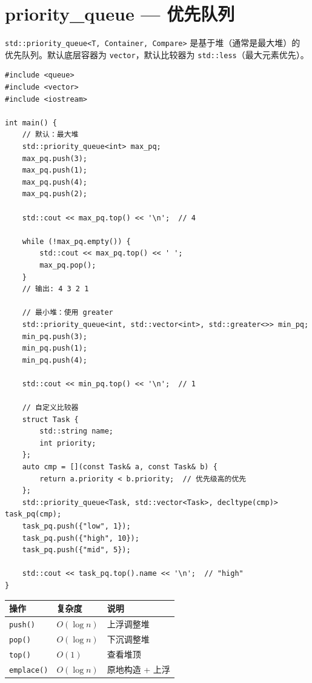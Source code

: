 \documentclass[12pt,a4paper,fontset=fandol]{ctexbook}
\newcommand{\Fn}[1]{\texttt{#1()}}
\newcommand{\Tp}[1]{\texttt{#1}}
\begin{document}
\chapter{priority\_queue --- 优先队列}

\Tp{std::priority\_queue<T, Container, Compare>} 是基于堆（通常是最大堆）的
优先队列。默认底层容器为 \Tp{vector}，默认比较器为 \Tp{std::less}（最大元素优先）。

\begin{lstlisting}
#include <queue>
#include <vector>
#include <iostream>

int main() {
    // 默认：最大堆
    std::priority_queue<int> max_pq;
    max_pq.push(3);
    max_pq.push(1);
    max_pq.push(4);
    max_pq.push(2);

    std::cout << max_pq.top() << '\n';  // 4

    while (!max_pq.empty()) {
        std::cout << max_pq.top() << ' ';
        max_pq.pop();
    }
    // 输出: 4 3 2 1

    // 最小堆：使用 greater
    std::priority_queue<int, std::vector<int>, std::greater<>> min_pq;
    min_pq.push(3);
    min_pq.push(1);
    min_pq.push(4);

    std::cout << min_pq.top() << '\n';  // 1

    // 自定义比较器
    struct Task {
        std::string name;
        int priority;
    };
    auto cmp = [](const Task& a, const Task& b) {
        return a.priority < b.priority;  // 优先级高的优先
    };
    std::priority_queue<Task, std::vector<Task>, decltype(cmp)> task_pq(cmp);
    task_pq.push({"low", 1});
    task_pq.push({"high", 10});
    task_pq.push({"mid", 5});

    std::cout << task_pq.top().name << '\n';  // "high"
}
\end{lstlisting}

\begin{complexitybox}
\begin{tabularx}{\textwidth}{l l X}
\toprule
\textbf{操作} & \textbf{复杂度} & \textbf{说明} \\
\midrule
\Fn{push}   & $O(\log n)$ & 上浮调整堆 \\
\Fn{pop}    & $O(\log n)$ & 下沉调整堆 \\
\Fn{top}    & $O(1)$      & 查看堆顶 \\
\Fn{emplace}& $O(\log n)$ & 原地构造 + 上浮 \\
\bottomrule
\end{tabularx}
\end{complexitybox}
\end{document}
